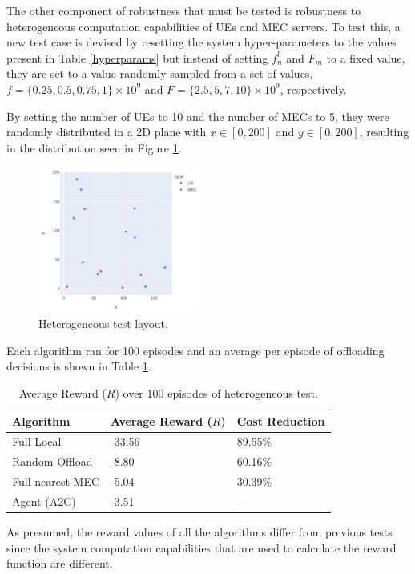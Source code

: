 The other component of robustness that must be tested is robustness to heterogeneous computation capabilities of \acrshort{UE}s and \acrshort{MEC} servers. To test this, a new test case is devised by resetting the system hyper-parameters to the values present in Table \ref{hyperparams} but instead of setting $f^l_n$ and $F_m$ to a fixed value, they are set to a value randomly sampled from a set of values, $f = \{0.25, 0.5, 0.75, 1\} \times 10^9$ and $F = \{2.5, 5, 7, 10\} \times 10^9$, respectively.

By setting the number of \acrshort{UE}s to 10 and the number of \acrshort{MEC}s to 5, they were randomly distributed in a 2D plane with $x \in [0, 200]$ and $y \in [0, 200]$, resulting in the distribution seen in Figure \ref{hetero_test}.

\begin{figure}[H]
  \centering
  \includegraphics[width=200px]{images/5_10_layout.png}
  \caption{Heterogeneous test layout.}  \label{hetero_test}
\end{figure}

Each algorithm ran for 100 episodes and an average per episode of offloading decisions is shown in Table \ref{hetero_table}.

\begin{table}[H]
\centering
\begin{tabular}{|l|l|l|}
\hline
Algorithm        & Average Reward ($R$) & Cost Reduction\\ \hline
Full Local       & -33.56 & 89.55\%\\
Random Offload   & -8.80 & 60.16\%\\
Full nearest MEC & -5.04 & 30.39\%\\ 
Agent (A2C) & -3.51 & -\\ \hline
\end{tabular}
\caption{Average Reward ($R$) over 100 episodes of heterogeneous test.} \label{hetero_table}
\end{table}

As presumed, the reward values of all the algorithms differ from previous tests since the system computation capabilities that are used to calculate the reward function are different.

